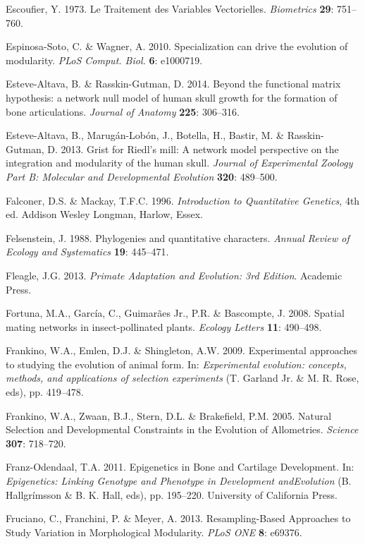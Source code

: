 \documentclass[12pt,twoside]{report}
\begin{document}
Escoufier, Y. 1973. Le Traitement des Variables Vectorielles.
\emph{Biometrics} \textbf{29}: 751--760.

Espinosa-Soto, C. \& Wagner, A. 2010. Specialization can drive the
evolution of modularity. \emph{PLoS Comput. Biol.} \textbf{6}: e1000719.

Esteve-Altava, B. \& Rasskin-Gutman, D. 2014. Beyond the functional
matrix hypothesis: a network null model of human skull growth for the
formation of bone articulations. \emph{Journal of Anatomy} \textbf{225}:
306--316.

Esteve-Altava, B., Marugán-Lobón, J., Botella, H., Bastir, M. \&
Rasskin-Gutman, D. 2013. Grist for Riedl's mill: A network model
perspective on the integration and modularity of the human skull.
\emph{Journal of Experimental Zoology Part B: Molecular and
Developmental Evolution} \textbf{320}: 489--500.

Falconer, D.S. \& Mackay, T.F.C. 1996. \emph{Introduction to
Quantitative Genetics}, 4th ed. Addison Wesley Longman, Harlow, Essex.

Felsenstein, J. 1988. Phylogenies and quantitative characters.
\emph{Annual Review of Ecology and Systematics} \textbf{19}: 445--471.

Fleagle, J.G. 2013. \emph{Primate Adaptation and Evolution: 3rd
Edition}. Academic Press.

Fortuna, M.A., García, C., Guimarães Jr., P.R. \& Bascompte, J. 2008.
Spatial mating networks in insect-pollinated plants. \emph{Ecology
Letters} \textbf{11}: 490--498.

Frankino, W.A., Emlen, D.J. \& Shingleton, A.W. 2009. Experimental
approaches to studying the evolution of animal form. In:
\emph{Experimental evolution: concepts, methods, and applications of
selection experiments} (T. Garland Jr. \& M. R. Rose, eds), pp.
419--478.

Frankino, W.A., Zwaan, B.J., Stern, D.L. \& Brakefield, P.M. 2005.
Natural Selection and Developmental Constraints in the Evolution of
Allometries. \emph{Science} \textbf{307}: 718--720.

Franz-Odendaal, T.A. 2011. Epigenetics in Bone and Cartilage
Development. In: \emph{Epigenetics: Linking Genotype and Phenotype in
Development andEvolution} (B. Hallgrímsson \& B. K. Hall, eds), pp.
195--220. University of California Press.

Fruciano, C., Franchini, P. \& Meyer, A. 2013. Resampling-Based
Approaches to Study Variation in Morphological Modularity. \emph{PLoS
ONE} \textbf{8}: e69376.
\end{document}
